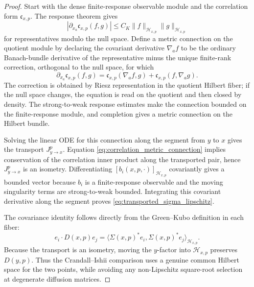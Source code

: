 \documentclass[12pt, letterpaper]{amsart}
\theoremstyle{plain}
\theoremstyle{definition}
\theoremstyle{remark}
\begin{document}
\begin{proof}
Start with the dense finite-response observable module and the correlation form
$\mathfrak c_{x,p}$.  The response theorem gives
\begin{equation}
    |\partial_{x_a}\mathfrak c_{x,p}(f,g)|
      \le C_K\|f\|_{\mathscr H_{x,p}}\|g\|_{\mathscr H_{x,p}}
\end{equation}
for representatives modulo the null space.  Define a metric connection on the
quotient module by declaring the covariant derivative $\nabla_a f$ to be the
ordinary Banach-bundle derivative of the representative minus the unique
finite-rank correction, orthogonal to the null space, for which
\begin{equation}
\label{eq:correlation_metric_connection}
    \partial_{x_a}\mathfrak c_{x,p}(f,g)
     =\mathfrak c_{x,p}(\nabla_a f,g)+\mathfrak c_{x,p}(f,\nabla_a g).
\end{equation}
The correction is obtained by Riesz representation in the quotient Hilbert
fiber; if the null space changes, the equation is read on the quotient and then
closed by density.  The strong-to-weak response estimates make the connection
bounded on the finite-response module, and completion gives a metric connection
on the Hilbert bundle.

Solving the linear ODE for this connection along the segment from $y$ to $x$
gives the transport $J_{y\to x}^{p}$.  Equation
\eqref{eq:correlation_metric_connection} implies conservation of the correlation
inner product along the transported pair, hence $J_{y\to x}^{p}$ is an isometry.
Differentiating $[b_i(x,p,\cdot)]_{\mathscr H_{x,p}}$ covariantly gives a
bounded vector because $b_i$ is a finite-response observable and the moving
singularity terms are strong-to-weak bounded.  Integrating this covariant
derivative along the segment proves \eqref{eq:transported_sigma_lipschitz}.

The covariance identity follows directly from the Green--Kubo definition in each
fiber:
\begin{equation}
    e_i\cdot D(x,p)e_j
      =\langle \Sigma(x,p)^*e_i,\Sigma(x,p)^*e_j\rangle_{\mathscr H_{x,p}} .
\end{equation}
Because the transport is an isometry, moving the $y$-factor into
$\mathscr H_{x,p}$ preserves $D(y,p)$.  Thus the Crandall--Ishii comparison uses
a genuine common Hilbert space for the two points, while avoiding any
non-Lipschitz square-root selection at degenerate diffusion matrices.
\end{proof}
\end{document}
